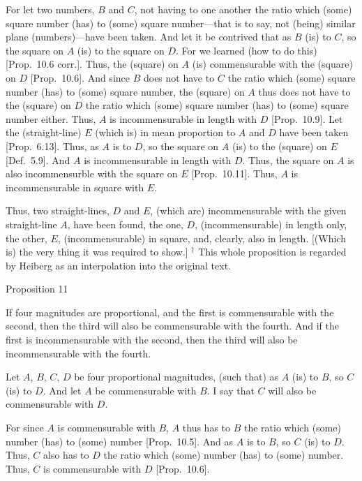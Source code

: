 For let two numbers, $B$ and $C$,  not having to one another
the ratio which (some) square number (has) to (some) square number---that
is to say, not (being) similar plane (numbers)---have been taken. And let it be contrived
that as $B$ (is) to $C$, so the square on $A$ (is) to the square on $D$.
For we learned (how to do this) [Prop.~10.6 corr.].
Thus, the (square) on $A$ (is) commensurable with the (square) on $D$
[Prop.~10.6]. And since $B$ does not have to $C$ the
ratio which (some) square number (has) to (some) square number, the
(square) on $A$ thus does not have to the (square) on $D$ the ratio which (some) square number (has) to (some) square number either. Thus, $A$ is
incommensurable in length with $D$ [Prop.~10.9].
Let the (straight-line) $E$ (which is) in mean proportion to $A$ and $D$ have
been taken [Prop.~6.13]. Thus, as $A$ is to $D$, so the square on $A$ (is) to the (square)
on $E$ [Def.~5.9]. And $A$ is incommensurable in length with $D$. Thus, the square on $A$ is also incommensurble
with the square on $E$ [Prop.~10.11]. 
Thus, $A$ is incommensurable in square with $E$.

Thus, two straight-lines, $D$ and $E$, (which are) incommensurable with the given
straight-line $A$, have been found, the one, $D$, (incommensurable)
in length only, the other, $E$, (incommensurable) in square, and, clearly, also in length. [(Which is) the very thing it was required to show.]
{\footnotesize\noindent$^\dag$ This whole proposition is regarded by Heiberg as an interpolation into the original text.}


\begin{center}
{\large Proposition 11}
\end{center}

If four magnitudes are proportional, and the
first is commensurable with the second, then the third will also be
commensurable with the fourth. And if the first is incommensurable with
the second, then the third will also be incommensurable with the fourth.

\epsfysize=0.5in
\centerline{}

Let $A$, $B$, $C$, $D$ be four proportional magnitudes, (such that) as
$A$ (is) to $B$, so $C$ (is) to $D$. And let $A$ be commensurable
with $B$. I say that $C$ will also be commensurable with $D$.

For since $A$ is commensurable with $B$, $A$ thus has to $B$ the ratio
which (some) number (has) to (some) number [Prop.~10.5]. And as $A$ is to $B$, so $C$ (is) to $D$. Thus, $C$ also has to $D$ the ratio which (some) number (has) to
(some) number. Thus, $C$ is commensurable with $D$ [Prop.~10.6].

